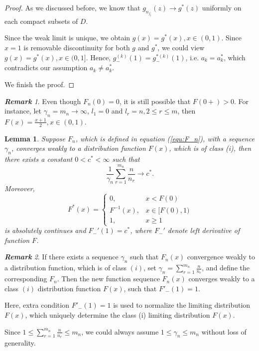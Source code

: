 \documentclass[12pt]{article}
\theoremstyle{plain}
\newtheorem{lem}{\textbf{Lemma}}
\theoremstyle{definition}
\theoremstyle{remark}
\newtheorem{rem}{\textbf{Remark}}
\begin{document}
\begin{proof}
As we discussed before, we know that $g_{n_{j_t}}(z)\rightarrow g^*(z)$ uniformly on each compact subsets of $D$. 

Since the weak limit is unique, we obtain $g(x)=g^*(x),x\in (0,1)$. Since $x=1$ is removable discontinuity for both $g$ and $g^*$, we could view $g(x)=g^*(x),x\in (0,1]$. Hence, $g^{(k)}_-(1)=g^{*(k)}_-(1)$, i.e. $a_k=a_k^*$, which contradicts our assumption $a_k\neq a_k^*$.

We finish the proof.

\end{proof}







\begin{rem}\label{stange}
    Even though $F_n(0)=0$, it is still possible that $F(0+)>0$. For instance, let $\gamma_{n}=m_n\to \infty$, $ l_1=0$ and $l_r=n,2\leq r\leq m$, then $F(x)=\frac{x+1}{2}, x\in (0,1)$.
\end{rem}

\begin{lem}\label{lem:necessary condition for the first class}
Suppose $F_n$, which is defined in equation (\ref{equ:F_n}), with a sequence $\gamma_n$, converges weakly to a distribution function $F(x)$, which is of class (i), then there exists a constant $0<c^*<\infty$ such that
$$\frac{1}{\gamma_n}\sum_{r=1}^{m_n}\frac{n}{n_r}\rightarrow c^* .$$
Moreover, \begin{equation*}
    F^{*}(x)=\left\{\begin{array}{cc}{0,} & {x < F(0)} \\ {F^{-1}(x),} & {x \in[F(0),1)} \\ {1,} & {x \geq 1}\end{array}\right.
    \end{equation*}
is absolutely continues and $F_-'(1)=c^*$, where $F_-'$ denote left derivative of function $F$.



\end{lem}
\begin{rem}
If there exists a sequence $\gamma_n$ such that $F_n(x)$ convergence weakly to a distribution function, which is of class $(i)$, set $\gamma_n=\sum_{r=1}^{m_n}\frac{n}{n_r}$, and define the corresponding $F_n$. Then the new function sequence $F_n(x)$ converges weakly to a class $(i)$ distribution function $F(x)$, such that $F'_-(1)=1$. 

Here, extra condition $F'_-(1)=1$ is used to normalize the limiting distribution $F(x)$, which uniquely determine the class (i) limiting distribution $F(x)$.

Since $1\leq\sum_{r=1}^{m_n}\frac{n}{n_r}\leq m_n$, we could always assume $1\leq \gamma_n\leq m_n$ without loss of generality.
\end{rem}
\end{document}
